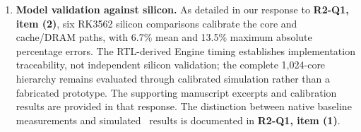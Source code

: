 \begin{enumerate}[label=(\arabic*)]
\item \textbf{Model validation against silicon.} As detailed in our response to \textbf{R2-Q1, item (2)}, six RK3562 silicon comparisons calibrate the core and cache/DRAM paths, with 6.7\% mean and 13.5\% maximum absolute percentage errors. The RTL-derived Engine timing establishes implementation traceability, not independent silicon validation; the complete 1,024-core hierarchy remains evaluated through calibrated simulation rather than a fabricated prototype. The supporting manuscript excerpts and calibration results are provided in that response. The distinction between native baseline measurements and simulated \name\ results is documented in \textbf{R2-Q1, item (1)}.

\end{enumerate}
